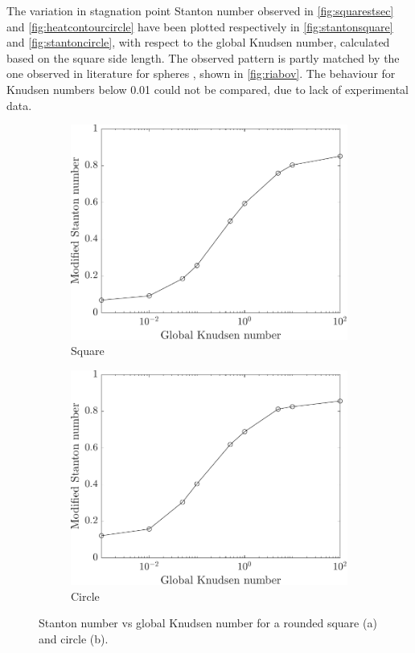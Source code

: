 The variation in stagnation point Stanton number observed in \autoref{fig:squarestsec} and \autoref{fig:heatcontourcircle} have been plotted respectively in \autoref{fig:stantonsquare} and \autoref{fig:stantoncircle}, with respect to the global Knudsen number, calculated based on the square side length. The observed pattern is partly matched by the one observed in literature for spheres \cite{riabov}, shown in \autoref{fig:riabov}. The behaviour for Knudsen numbers below 0.01 could not be compared, due to lack of experimental data.

\begin{figure}
    \centering
    \begin{subfigure}{0.49\textwidth}
        \centering
        \includegraphics[width=\textwidth]{Images/4. Results/Square Kn/stkn.pdf}
        \caption{Square}
        \label{fig:stantonsquare}
    \end{subfigure}
    \hfill
    \begin{subfigure}{0.49\textwidth}
        \centering
        \includegraphics[width=\textwidth]{Images/4. Results/Circle Kn/stkn.pdf}
        \caption{Circle}
        \label{fig:stantoncircle}
    \end{subfigure}
    \caption{Stanton number vs global Knudsen number for a rounded square (a) and circle (b).}
    \label{fig:stanton}
\end{figure}

